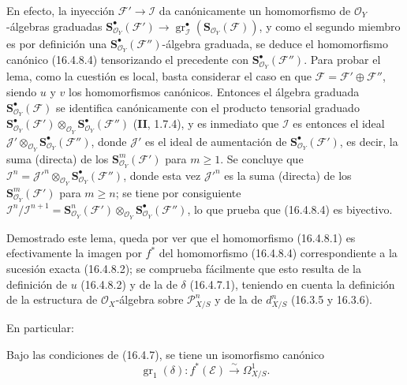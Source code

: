 En efecto, la inyección $\mathscr{F}'\to\mathscr{I}$ da canónicamente un
homomorfismo de $\mathcal{O}_Y$-álgebras graduadas\linebreak
$\mathbf{S}_{\mathcal{O}_Y}^{\bullet}(\mathscr{F}')\to\allowbreak
\operatorname{gr}_{\mathscr{I}}^\bullet
(\mathbf{S}_{\mathcal{O}_Y}(\mathscr{F}))$, y como el segundo miembro es por
definición una $\mathbf{S}_{\mathcal{O}_Y}^{\bullet}(\mathscr{F}'')$-álgebra
graduada, se deduce el homomorfismo canónico (16.4.8.4) tensorizando el
precedente con $\mathbf{S}_{\mathcal{O}_Y}^{\bullet}(\mathscr{F}'')$. Para
probar el lema, como la cuestión es local, basta considerar el caso en que
$\mathscr{F}=\mathscr{F}'\oplus\mathscr{F}''$, siendo $u$ y $v$ los
homomorfismos canónicos. Entonces el álgebra graduada
$\mathbf{S}_{\mathcal{O}_Y}^{\bullet}(\mathscr{F})$ se identifica canónicamente con el
producto tensorial graduado
$\mathbf{S}_{\mathcal{O}_Y}^{\bullet}(\mathscr{F}')
\otimes_{\mathcal{O}_Y}
\mathbf{S}_{\mathcal{O}_Y}^{\bullet}(\mathscr{F}'')$ (\textbf{II}, 1.7.4), y es
inmediato que $\mathscr{I}$ es entonces el ideal
$\mathscr{J}'\otimes_{\mathcal{O}_Y}
\mathbf{S}_{\mathcal{O}_Y}^{\bullet}(\mathscr{F}'')$, donde $\mathscr{J}'$ es
el ideal de aumentación de
$\mathbf{S}_{\mathcal{O}_Y}^{\bullet}(\mathscr{F}')$, es decir, la suma
(directa) de los $\mathbf{S}_{\mathcal{O}_Y}^m(\mathscr{F}')$ para $m\geq1$. Se
concluye que $\mathscr{I}^n=\mathscr{J}'^n\otimes_{\mathcal{O}_Y}
\mathbf{S}_{\mathcal{O}_Y}^{\bullet}(\mathscr{F}'')$, donde esta vez
$\mathscr{J}'^n$ es la suma (directa) de los
$\mathbf{S}_{\mathcal{O}_Y}^m(\mathscr{F}')$ para $m\geq n$; se tiene por consiguiente
$\mathscr{I}^n/\mathscr{I}^{n+1}=
\mathbf{S}_{\mathcal{O}_Y}^n(\mathscr{F}')\otimes_{\mathcal{O}_Y}
\mathbf{S}_{\mathcal{O}_Y}^{\bullet}(\mathscr{F}'')$, lo que prueba que
(16.4.8.4) es biyectivo.

Demostrado este lema, queda por ver que el homomorfismo (16.4.8.1) es
efectivamente la imagen por $f^*$ del homomorfismo (16.4.8.4) correspondiente a la sucesión
exacta (16.4.8.2); se comprueba fácilmente que esto resulta de la definición de
$u$ (16.4.8.2) y de la de $\delta$ (16.4.7.1), teniendo en cuenta la definición
de la estructura de $\mathcal{O}_X$-álgebra sobre $\mathscr{P}_{X/S}^n$ y de
la de $d_{X/S}^n$ (16.3.5 y 16.3.6).

En particular:

\begin{corollary}[16.4.9]
\label{IV.16.4.9}
Bajo las condiciones de \textup{(16.4.7)}, se tiene un isomorfismo canónico
\[
  \operatorname{gr}_1(\delta):f^*(\mathscr{E})
  \xrightarrow{\sim}\varOmega_{X/S}^1.
  \tag{16.4.9.1}
  \label{IV.16.4.9.1}
\]
\end{corollary}

